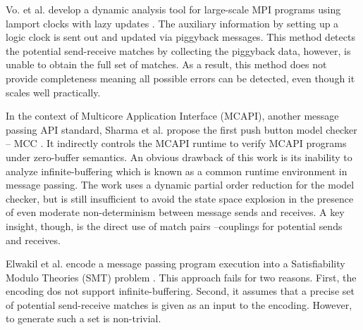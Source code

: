 Vo. et al. develop a dynamic analysis tool for large-scale MPI programs using lamport clocks with lazy updates \cite{}. The auxiliary information by setting up a logic clock is sent out and updated via piggyback messages. This method detects the potential send-receive matches by collecting the piggyback data, however, is unable to obtain the full set of matches. As a result, this method does not provide completeness meaning all possible errors can be detected, even though it scales well practically.

In the context of Multicore Application Interface (MCAPI), another message passing API standard, Sharma et al. propose the first push button model checker -- MCC \cite{}. It indirectly controls the MCAPI runtime to verify MCAPI programs under zero-buffer semantics. An obvious drawback of this work is its inability to analyze infinite-buffering which is known as a common runtime environment in message passing. The work uses a dynamic partial order reduction for the model checker, but is still insufficient to avoid the state space explosion in the presence of even moderate non-determinism between message sends and receives. A key insight, though, is the direct use of match pairs --couplings for potential sends and receives.

Elwakil et al. encode a message passing program execution into a Satisfiability Modulo Theories (SMT) problem \cite{}. This approach fails for two reasons. First, the encoding dos not support infinite-buffering. Second, it assumes that a precise set of potential send-receive matches is given as an input to the encoding. However, to generate such a set is non-trivial.

